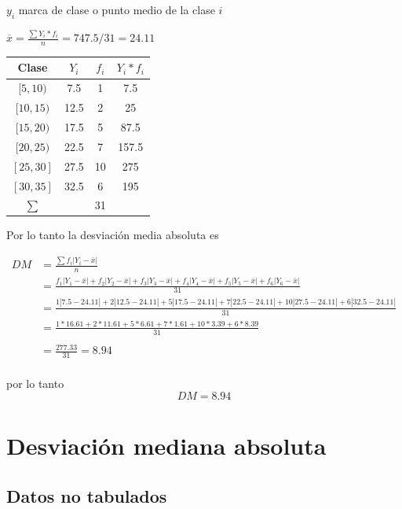 \documentclass[
  11pt,
]{krantz}
\theoremstyle{definition}
\theoremstyle{definition}
\theoremstyle{definition}
\theoremstyle{definition}
\theoremstyle{remark}
\begin{document}
\(y_i\) marca de clase o punto medio de la clase \(i\)

\(\overline{x}=\frac{\sum Y_i*f_i}{n}=747.5/31=24.11\)

\begin{longtable}[]{@{}cccc@{}}
\toprule
Clase & \(Y_i\) & \(f_i\) & \(Y_i*f_i\) \\
\midrule
\endhead
\([5,10)\) & 7.5 & 1 & 7.5 \\
\([10,15)\) & 12.5 & 2 & 25 \\
\([15,20)\) & 17.5 & 5 & 87.5 \\
\([20,25)\) & 22.5 & 7 & 157.5 \\
\([25,30]\) & 27.5 & 10 & 275 \\
\([30,35]\) & 32.5 & 6 & 195 \\
\(\sum\) & & 31 & \\
\bottomrule
\end{longtable}

Por lo tanto la desviación media absoluta es

\[
\begin{aligned}
DM&=\frac{\sum f_i\left \vert Y_i-\overline{x}\right \vert}{n}\\
&=\frac{f_1\left\vert Y_1-\overline{x}\right \vert +f_2\left\vert Y_2-\overline{x}\right \vert +f_3\left\vert Y_3-\overline{x}\right \vert +f_4\left\vert Y_4-\overline{x}\right \vert +f_5\left\vert Y_5-\overline{x}\right \vert +f_6\left\vert Y_6-\overline{x}\right \vert }{31}\\
&=\frac{1\left\vert 7.5-24.11\right \vert +2\left\vert 12.5-24.11\right \vert +5\left\vert 17.5-24.11\right \vert +7\left\vert 22.5-24.11\right \vert +10\left\vert 27.5-24.11\right \vert +6\left\vert 32.5-24.11\right \vert }{31}\\
&=\frac{1*16.61 +2*11.61 +5*6.61 +7*1.61 +10*3.39 +6*8.39 }{31}\\
\\
&=\frac{277.33}{31}=8.94\\
\end{aligned}
\]

por lo tanto \[DM=8.94\]

\hypertarget{desviaciuxf3n-mediana-absoluta}{%
\section{Desviación mediana absoluta}\label{desviaciuxf3n-mediana-absoluta}}

\hypertarget{datos-no-tabulados-2}{%
\subsection{Datos no tabulados}\label{datos-no-tabulados-2}}
\end{document}

